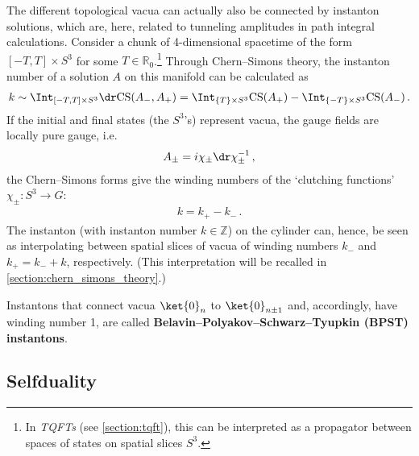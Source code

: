     The different topological vacua can actually also be connected by instanton solutions, which are, here, related to tunneling amplitudes in path integral calculations. Consider a chunk of 4-dimensional spacetime of the form $[-T,T]\times S^3$ for some $T\in\mathbb{R}_0$.\footnote{In \textit{TQFTs} (see \cref{section:tqft}), this can be interpreted as a propagator between spaces of states on spatial slices $S^3$.} Through Chern--Simons theory, the instanton number of a solution $A$ on this manifold can be calculated as
    \begin{gather}
        k \sim \Int_{[-T,T]\times S^3}\dr\mathrm{CS}(A_-,A_+) = \Int_{\{T\}\times S^3}\mathrm{CS}(A_+)-\Int_{\{-T\}\times S^3}\mathrm{CS}(A_-)\,.
    \end{gather}
    If the initial and final states (the $S^3$'s) represent vacua, the gauge fields are locally pure gauge, i.e.
    \begin{gather}
        A_\pm = i\chi_\pm\dr\chi_\pm^{-1}\,,
    \end{gather}
    the Chern--Simons forms give the winding numbers of the `clutching functions' $\chi_\pm:S^3\rightarrow G$:
    \begin{gather}
        k = k_+-k_-\,.
    \end{gather}
    The instanton (with instanton number $k\in\mathbb{Z}$) on the cylinder can, hence, be seen as interpolating between spatial slices of vacua of winding numbers $k_-$ and $k_+=k_-+k$, respectively. (This interpretation will be recalled in \cref{section:chern_simons_theory}.)
    
    \begin{example}
        Instantons that connect vacua $\ket{0}_n$ to $\ket{0}_{n\pm1}$ and, accordingly, have winding number 1, are called \textbf{Belavin--Polyakov--Schwarz--Tyupkin (BPST) instantons}.
    \end{example}


\subsection{Selfduality}

